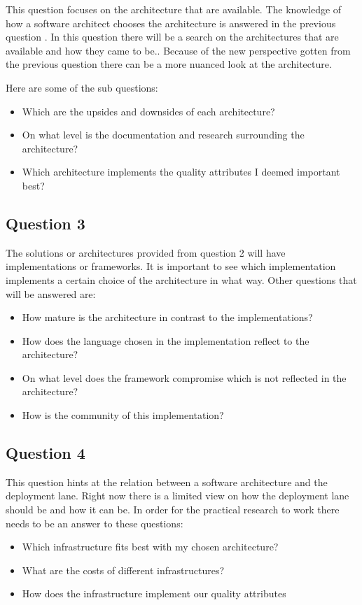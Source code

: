This question focuses on the architecture that are available. The knowledge of how a software architect chooses the architecture is answered in the previous question . In this question there will be a search on the architectures that are available and how they came to be.. Because of the new perspective gotten from the previous question there can be a more nuanced look at the architecture.

Here are some of the sub questions:
\begin{itemize}
	\item Which are the upsides and downsides of each architecture?
	\item On what level is the documentation and research surrounding the architecture?
	\item Which architecture implements the quality attributes I deemed important best?
\end{itemize}

\subsection{Question 3}

The solutions or architectures provided from question 2 will have implementations or frameworks. It is important to see which implementation implements a certain choice of the architecture in what way. Other questions that will be answered are:
\begin{itemize}
	\item How mature is the architecture in contrast to the implementations?
	\item How does the language chosen in the implementation reflect to the architecture?
	\item On what level does the framework compromise which is not reflected in the architecture?
	\item How is the community of this implementation?
\end{itemize}

\subsection{Question 4}


This question hints at the relation between a software architecture and the deployment lane. Right now there is a limited view on how the deployment lane should be and how it can be. In order for the practical research to work there needs to be an answer to these questions:
\begin{itemize}
	\item Which infrastructure fits best with my chosen architecture?
	\item What are the costs of different infrastructures?
	\item How does the infrastructure implement our quality attributes
\end{itemize}
